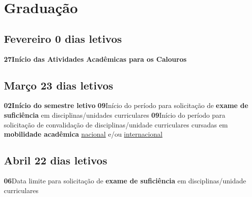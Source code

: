 \documentclass[thesis]{hmcposter}
\begin{document}
\begin{poster}
\begin{center}
\begin{table}
\centering
{}
\end{table}
\newline
\null
\newline
\end{center}
\vfill
\null
\newpage\section{\color{hmcorange}Graduação}\subsection{Fevereiro \hfill 0 dias letivos}\textbf{27}\qquad \textbf{Início das Atividades Acadêmicas para os Calouros} \newline \null\subsection{Março \hfill 23 dias letivos}\textbf{02}\qquad \textbf{Início do semestre letivo} \newline \null\textbf{09}\qquad Início do período para solicitação de \textbf{exame de suficiência} em disciplinas/unidades curriculares \newline \null\textbf{09}\qquad Início do período para solicitação de convalidação de disciplinas/unidade curriculares cursadas em \textbf{mobilidade acadêmica} \underline{nacional} e/ou \underline{internacional} \newline \null\subsection{Abril \hfill 22 dias letivos}\textbf{06}\qquad Data limite para solicitação de \textbf{exame de suficiência} em disciplinas/unidade curriculares \newline \null\vfill\null
\columnbreak

\end{poster}
\end{document}
